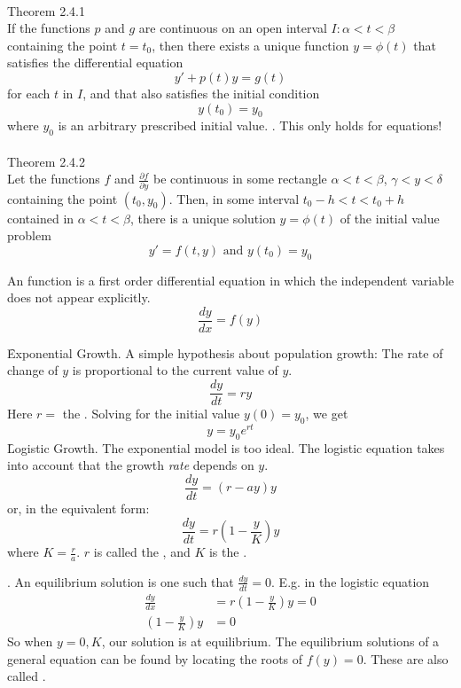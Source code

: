 \\
Theorem 2.4.1\\
If the functions $p$ and $g$ are continuous on an open interval $I:\alpha < t < \beta$ containing the point $t = t_0$, then there exists a unique function $y = \phi(t)$ that satisfies the differential equation 
$$y' + p(t)y = g(t)$$
for each $t$ in $I$, and that also satisfies the initial condition
$$y(t_0) = y_0$$
where $y_0$ is an arbitrary prescribed initial value.
. This only holds for  equations!\\\\
Theorem 2.4.2\\
Let the functions $f$ and $\frac{\partial f}{\partial y}$ be continuous in some rectangle $\alpha < t < \beta$, $\gamma < y < \delta$ containing the point $(t_0, y_0)$. Then, in some interval $t_0 - h < t < t_0 + h$ contained in $\alpha < t < \beta$, there is a unique solution $y = \phi(t)$ of the initial value problem
$$y' = f(t,y) \text{ and } y(t_0) = y_0$$

An  function is a first order differential equation in which the independent variable does not appear explicitly.
\begin{equation}
\frac{dy}{dx} = f(y)
\end{equation}

\begin{itemize}
\f Exponential Growth. A simple hypothesis about population growth: The rate of change of $y$ is proportional to the current value of $y$. $$\frac{dy}{dt} = ry$$
Here $r = $ the . Solving for the initial value $y(0) = y_0$, we get 
$$ y = y_0e^{rt}$$
\f Logistic Growth. The exponential model is too ideal. The logistic equation takes into account that the growth \emph{rate} depends on $y$. 
$$ \frac{dy}{dt} = (r - ay)y$$
or, in the equivalent form:
$$ \frac{dy}{dt} = r\left(1 - \frac{y}{K}\right)y$$
where $K = \frac{r}{a}$. $r$ is called the , and $K$ is the .
\end{itemize}

. An equilibrium solution is one such that $\frac{dy}{dt} = 0$. E.g. in the logistic equation
\begin{align*}
	\frac{dy}{dx} &= r\left(1 - \frac{y}{K}\right)y = 0\\
		(1 - \frac{y}{K})y &= 0
\end{align*}
So when $y = 0,K$, our solution is at equilibrium. The equilibrium solutions of a general equation can be found by locating the roots of $f(y) = 0$. These are also called .

